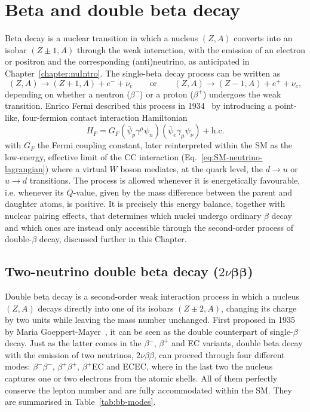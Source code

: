 \chapter{Beta and double beta decay}
Beta decay is a nuclear transition in which a nucleus $(Z, A)$ converts into an isobar $(Z \pm 1, A)$ through the weak interaction, with the emission of an electron or positron and the corresponding (anti)neutrino, as anticipated in Chapter~\ref{chapter:nuIntro}. The single-beta decay process can be written as
\begin{equation}
    \label{eq:single-beta-decay}
    (Z, A) \longrightarrow (Z+1, A) + e^- + \overline{\nu}_e \qquad \text{or} \qquad 
    (Z, A) \longrightarrow (Z-1, A) + e^+ + \nu_e,
\end{equation}
depending on whether a neutron ($\beta^-$) or a proton ($\beta^+$) undergoes the weak transition. Enrico Fermi described this process in 1934~\cite{Fermi1934} by introducing a point-like, four-fermion contact interaction Hamiltonian
\begin{equation}
    H_F = G_F \left( \overline{\psi}_p \gamma^\mu \psi_n \right)\left( \overline{\psi}_e \gamma_\mu \psi_\nu \right) + \text{h.c.}
\end{equation} 
with $G_F$ the Fermi coupling constant, later reinterpreted within the \ac{SM} as the low-energy, effective limit of the \ac{CC} interaction (Eq.~\ref{eq:SM-neutrino-lagrangian}) where a virtual $W$ boson mediates, at the quark level, the $d \to u$ or $u \to d$ transitions. The process is allowed whenever it is energetically favourable, i.e. whenever its $Q$-value, given by the mass difference between the parent and daughter atoms, is positive. It is precisely this energy balance, together with nuclear pairing effects, that determines which nuclei undergo ordinary $\beta$ decay and which ones are instead only accessible through the second-order process of double-$\beta$ decay, discussed further in this Chapter.

\section{Two-neutrino double beta decay (\texorpdfstring{$2\nu\boldsymbol{\beta}\boldsymbol{\beta}$}{2vbb})}
\label{sec:2nubetabeta}
Double beta decay is a second-order weak interaction process in which a nucleus $(Z, A)$ decays directly into one of its isobars $(Z\pm2, A)$, changing its charge by two units while leaving the mass number unchanged. First proposed in 1935 by Maria Goeppert-Mayer~\cite{firstDoubleBeta}, it can be seen as the double counterpart of single-$\beta$ decay. Just as the latter comes in the $\beta^-$, $\beta^+$ and \ac{EC} variants, double beta decay with the emission of two neutrinos, $2\nu\beta\beta$, can proceed through four different modes: $\beta^-\beta^-$, $\beta^+\beta^+$, $\beta^+$\ac{EC} and \ac{EC}\ac{EC}, where in the last two the nucleus captures one or two electrons from the atomic shells. All of them perfectly conserve the lepton number and are fully accommodated within the \ac{SM}. They are summarised in Table~\ref{tab:bb-modes}.

